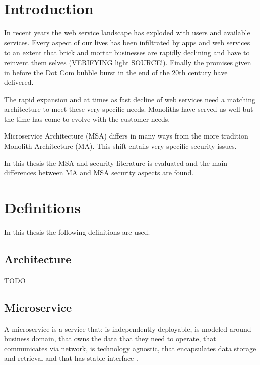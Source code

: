 


\section{Introduction}

In recent years the web service landscape has exploded 
with users and available services. Every aspect of our lives 
has been infiltrated by apps and web services to 
an extent that brick and mortar businesses are rapidly declining 
and have to reinvent them selves (VERIFYING light SOURCE!).
Finally the promises given in before the Dot Com bubble burst 
in the end of the 20th century have delivered.

The rapid expansion and at times as fast decline of web services 
need a matching architecture to meet these very specific needs. 
Monoliths have served us well but the time has come to evolve with the customer needs.

Microservice Architecture (MSA) differs in many ways from 
the more tradition Monolith Architecture (MA). This shift entails very specific security issues.

In this thesis the MSA and security literature is evaluated and the main differences between
MA and MSA security aspects are found.





\section{Definitions}

In this thesis the following definitions are used.

\subsection{Architecture}

TODO


\subsection{Microservice}

A microservice is a service that: is independently deployable,
is modeled around business domain,
that owns the data that they need to operate,
that communicates via network,
is technology agnostic,
that encapsulates data storage and retrieval and 
that has stable interface \citep{newman2019}.

